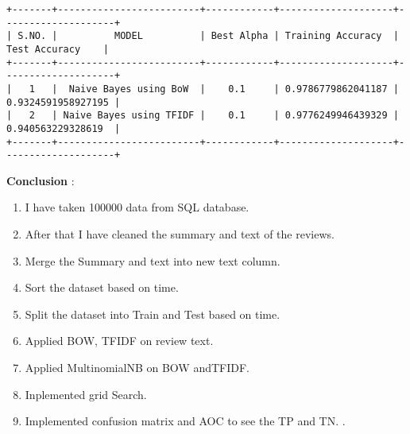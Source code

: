 \documentclass[11pt]{article}
\providecommand{\tightlist}{%
      \setlength{\itemsep}{0pt}\setlength{\parskip}{0pt}}
\begin{document}
    \begin{Verbatim}[commandchars=\\\{\}]
+-------+-------------------------+------------+--------------------+--------------------+
| S.NO. |          MODEL          | Best Alpha | Training Accuracy  |   Test Accuracy    |
+-------+-------------------------+------------+--------------------+--------------------+
|   1   |  Naive Bayes using BoW  |    0.1     | 0.9786779862041187 | 0.9324591958927195 |
|   2   | Naive Bayes using TFIDF |    0.1     | 0.9776249946439329 | 0.940563229328619  |
+-------+-------------------------+------------+--------------------+--------------------+

    \end{Verbatim}

    \textbf{Conclusion} :

\begin{enumerate}
\def\labelenumi{\arabic{enumi}.}
\tightlist
\item
  I have taken 100000 data from SQL database.
\item
  After that I have cleaned the summary and text of the reviews.
\item
  Merge the Summary and text into new text column.
\item
  Sort the dataset based on time.
\item
  Split the dataset into Train and Test based on time.
\item
  Applied BOW, TFIDF on review text.
\item
  Applied MultinomialNB on BOW andTFIDF.
\item
  Inplemented grid Search.
\item
  Implemented confusion matrix and AOC to see the TP and TN. .
\end{enumerate}


    
    
    
    
\end{document}
